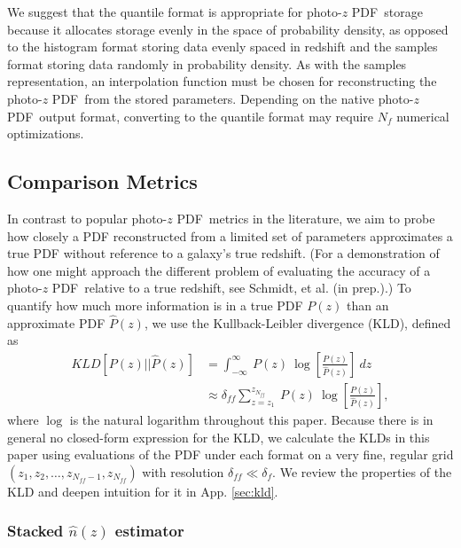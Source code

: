 \documentclass[\docopts]{\docclass}
\newcommand{\pz}{photo-$z$ PDF}
\begin{document}
We suggest that the quantile format is appropriate for \pz\ storage because it
allocates storage evenly in the space of probability density, as opposed to the
histogram format storing data evenly spaced in redshift and the samples format
storing data randomly in probability density.  As with the samples
representation, an interpolation function must be chosen for reconstructing the
\pz\ from the stored parameters.  Depending on the native \pz\ output format,
converting to the quantile format may require $N_{f}$ numerical optimizations.





\subsection{Comparison Metrics}
\label{sec:metric}

In contrast to popular \pz\ metrics in the literature, we aim to probe how
closely a PDF reconstructed from a limited set of parameters approximates a
true PDF without reference to a galaxy's true redshift.  (For a demonstration
of how one might approach the different problem of evaluating the accuracy of a
\pz\ relative to a true redshift, see Schmidt, et al. (in prep.).)  To quantify
how much more information is in a true PDF $P(z)$ than an approximate PDF
$\hat{P}(z)$, we use the Kullback-Leibler divergence (KLD), defined as
\begin{align}
  \label{eq:kld}
  KLD[P(z) || \hat{P}(z)] &= \int_{-\infty}^{\infty}\ P(z)\
\log\left[\frac{P(z)}{\hat{P}(z)}\right]\ dz\\
  &\approx \delta_{ff}\sum_{z=z_{1}}^{z_{N_{ff}}}\ P(z)\
\log\left[\frac{P(z)}{\hat{P}(z)}\right],
\end{align}
where $\log$ is the natural logarithm throughout this paper.  Because there is
in general no closed-form expression for the KLD, we calculate the KLDs in this
paper using evaluations of the PDF under each format on a very fine, regular
grid $(z_{1}, z_{2}, \dots, z_{N_{ff}-1}, z_{N_{ff}})$ with resolution
$\delta_{ff}\ll\delta_{f}$.  We review the properties of the KLD and deepen
intuition for it in App. \ref{sec:kld}.

\subsubsection{Stacked $\hat{n}(z)$ estimator}
\label{sec:stacked_metric}
\end{document}
